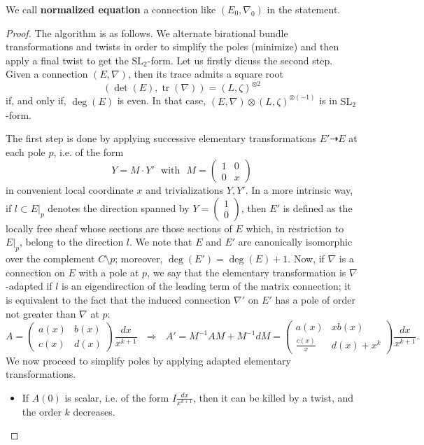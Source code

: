 \documentclass[12]{amsart}
\newcommand{\SL}{\mathrm{SL}_2}
\DeclareMathOperator{\tr}{tr}
\begin{document}
We call {\bf normalized equation} a connection like $(E_0,\nabla_0)$ in the statement.

\begin{proof}The algorithm is as follows. We alternate birational bundle transformations and twists in order to simplify
the poles (minimize) and then apply a final twist to get the  $\SL$-form. Let us firstly dicuss the second step.
Given a connection $(E,\nabla)$, then its trace admits a square root
$$(\det(E),\tr(\nabla))=(L,\zeta)^{\otimes 2}$$
if, and only if, $\deg(E)$ is even. In that case, $(E,\nabla)\otimes (L,\zeta)^{\otimes(-1)}$ is in $\SL$-form.

The first step is done by applying
successive elementary transformations $E'\dashrightarrow E$ at each pole $p$, i.e. of the form 
$$Y=M\cdot Y'\ \ \ \text{with}\ \ \ M=\begin{pmatrix}1&0\\ 0&x\end{pmatrix}$$
in convenient local coordinate $x$ and trivializations $Y,Y'$. 
In a more intrinsic way, if $l\subset E\vert_p$ denotes the direction spanned by $Y=\begin{pmatrix}1\\ 0\end{pmatrix}$,
then $E'$ is defined as the locally free sheaf whose sections are those sections of $E$ which, in restriction to $E\vert_p$,
belong to the direction $l$. We note that $E$ and $E'$ are canonically isomorphic over the complement $C\setminus p$;
moreover, $\deg(E')=\deg(E)+1$.
Now, if $\nabla$ is a connection on $E$ with a pole at $p$, we say that the elementary transformation is $\nabla$-adapted
if $l$ is an eigendirection of the leading term of the matrix connection; it is equivalent to the fact that
the induced connection $\nabla'$ on $E'$ has a pole of order not greater than $\nabla$ at $p$:
$$
A=\begin{pmatrix}a(x)&b(x)\\ c(x)&d(x)\end{pmatrix}\frac{dx}{x^{k+1}}\ \ \ \Rightarrow\ \ \ 
A'=M^{-1}AM+M^{-1}dM=\begin{pmatrix}a(x)&xb(x)\\ \frac{c(x)}{x}&d(x)+x^k\end{pmatrix}\frac{dx}{x^{k+1}}.$$
We now proceed to simplify poles by applying adapted elementary transformations.
\begin{itemize}
\item If $A(0)$ is scalar, i.e. of the form $I\frac{dx}{x^{k+1}}$, then it can be killed by a twist, and the order $k$ decreases.

\end{itemize}
\end{proof}
\end{document}
